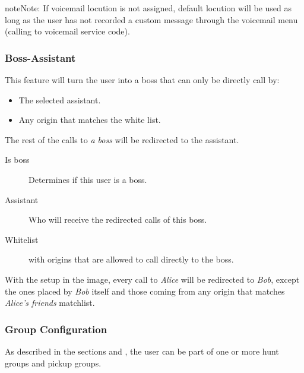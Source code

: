 \documentclass[letterpaper,10pt,english]{sphinxmanual}
\begin{document}
\begin{notice}{note}{Note:}
If voicemail locution is not assigned, default locution will be used as long as
the user has not recorded a custom message through the voicemail menu (calling to
voicemail service code).
\end{notice}


\subsubsection{Boss-Assistant}
\label{administration_portal/client/vpbx/users:boss-assistant}
This feature will turn the user into a boss that can only be directly call by:
\begin{itemize}
\item {} 
The selected assistant.

\item {} 
Any origin that matches the white list.

\end{itemize}

The rest of the calls to \emph{a boss} will be redirected to the assistant.
\begin{description}
\item[{Is boss}] \leavevmode{}\label{administration_portal/client/vpbx/users:term-is-boss}
Determines if this user is a boss.

\item[{Assistant}] \leavevmode{}\label{administration_portal/client/vpbx/users:term-assistant}
Who will receive the redirected calls of this boss.

\item[{Whitelist}] \leavevmode{}\label{administration_portal/client/vpbx/users:term-whitelist}
{\hyperref[administration_portal/client/vpbx/routing_tools/match_lists:match\string-lists]{}} with origins that are allowed to call directly to
the boss.

\end{description}

With the setup in the image, every call to \emph{Alice} will be redirected to \emph{Bob},
except the ones placed by \emph{Bob} itself and those coming from any origin that matches
\emph{Alice's friends} matchlist.


\subsubsection{Group Configuration}
\label{administration_portal/client/vpbx/users:group-configuration}
As described in the sections {\hyperref[administration_portal/client/vpbx/routing_endpoints/hunt_groups:huntgroups]{}} and {\hyperref[administration_portal/client/vpbx/user_configuration/pick_up_groups:capture\string-groups]{}}, the
user can be part of one or more hunt groups and pickup groups.
\end{document}
